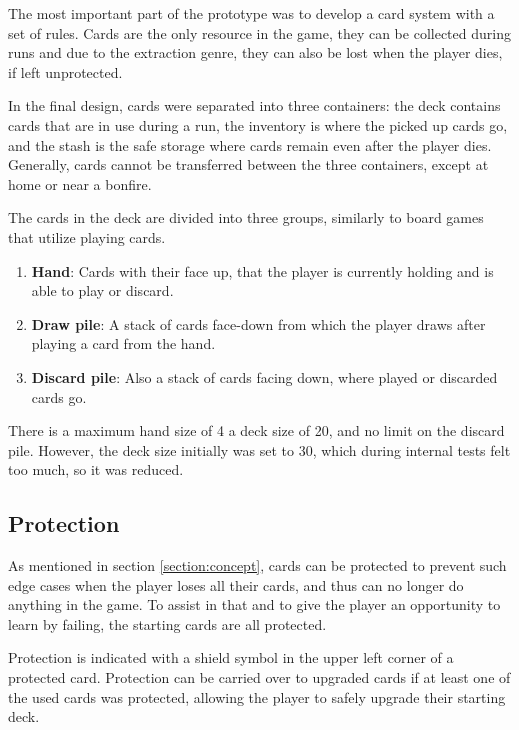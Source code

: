 The most important part of the prototype was to develop a card system with a set of rules. Cards are the only resource in the game, they can be collected during runs and due to the extraction genre, they can also be lost when the player dies, if left unprotected.

In the final design, cards were separated into three containers: the deck contains cards that are in use during a run, the inventory is where the picked up cards go, and the stash is the safe storage where cards remain even after the player dies. Generally, cards cannot be transferred between the three containers, except at home or near a bonfire.

The cards in the deck are divided into three groups, similarly to board games that utilize playing cards.

\begin{enumerate}
  \item \textbf{Hand}: Cards with their face up, that the player is currently holding and is able to play or discard. 
  \item \textbf{Draw pile}: A stack of cards face-down from which the player draws after playing a card from the hand.
  \item \textbf{Discard pile}: Also a stack of cards facing down, where played or discarded cards go.
\end{enumerate}

There is a maximum hand size of 4 a deck size of 20, and no limit on the discard pile. However, the deck size initially was set to 30, which during internal tests felt too much, so it was reduced.



\subsection{Protection}

As mentioned in section \ref{section:concept}, cards can be protected to prevent such edge cases when the player loses all their cards, and thus can no longer do anything in the game. To assist in that and to give the player an opportunity to learn by failing, the starting cards are all protected.

Protection is indicated with a shield symbol in the upper left corner of a protected card. Protection can be carried over to upgraded cards if at least one of the used cards was protected, allowing the player to safely upgrade their starting deck.



